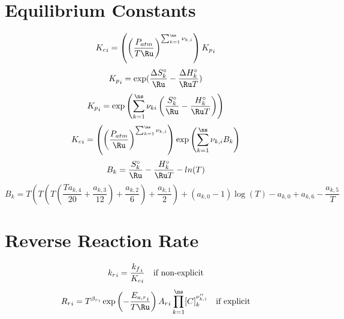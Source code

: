 \documentclass[a4paper,10pt]{article}
\begin{document}
\section{Equilibrium Constants}
\begin{dmath} {K_c}_{i} = \left(\left(\frac{P_{atm}}{T \Ru}\right)^{\sum_{k=1}^{\ns} \nu_{k,i}}\right) {K_p}_{i}\end{dmath} 
\begin{dmath} {K_p}_{i} = \text{exp}(\frac{\Delta S^{\circ}_k}{\Ru} - \frac{\Delta H^{\circ}_k}{\Ru T})\end{dmath} 
\begin{dmath} {K_p}_{i} = \text{exp}\left(\sum_{k=1}^{\ns}\nu_{ki}\left(\frac{S^{\circ}_k}{\Ru} - \frac{H^{\circ}_k}{\Ru T}\right)\right)\end{dmath} 
\begin{dmath} {K_c}_{i} = \left(\left(\frac{P_{atm}}{\Ru}\right)^{\sum_{k=1}^{\ns} \nu_{k,i}}\right) \operatorname{exp}\left({\sum_{k=1}^{\ns} \nu_{k,i} B_{k}}\right)\end{dmath} 
\begin{dmath} B_{k}= \frac{S^{\circ}_k}{\Ru} - \frac{H^{\circ}_k}{\Ru T} - ln(T)\end{dmath} 
\begin{dmath} B_{k} = T \left(T \left(T \left(\frac{T a_{k,4}}{20} + \frac{a_{k,3}}{12}\right) + \frac{a_{k,2}}{6}\right) + \frac{a_{k,1}}{2}\right) + \left(a_{k,0} - 1\right) \log{\left (T \right )} - a_{k,0} + a_{k,6} - \frac{a_{k,5}}{T}\end{dmath} 
\section{Reverse Reaction Rate}
\begin{dmath} {k_r}_{i}=\frac{{k_f}_{i}}{{K_c}_{i}}\text{\quad if non-explicit}\end{dmath} 
\begin{dmath} {R_r}_{i}=T^{{\beta_r}_{i}} \operatorname{exp}\left({- \frac{{E_{a,r}}_{i}}{T \Ru}}\right) {A_{r}}_{i} \prod_{k=1}^{\ns} [C]_{k}^{\nu^{\prime\prime}_{k,i}}\text{\quad if explicit}\end{dmath} 
\end{document}
